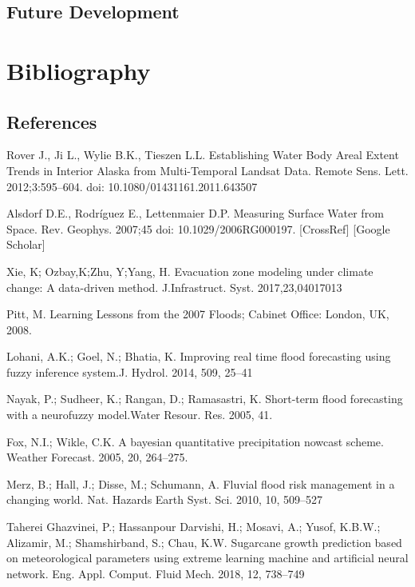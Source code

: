 \documentclass[12pt, a4paper]{report}
\begin{document}
\section{Future Development}

\newpage{}

\chapter{Bibliography} 

\section{References}

\begin{thebibliography}{widest entry}
 Rover J., Ji L., Wylie B.K., Tieszen L.L. Establishing Water Body Areal Extent Trends in Interior Alaska from Multi-Temporal Landsat Data. Remote Sens. Lett. 2012;3:595–604. doi: 10.1080/01431161.2011.643507

 Alsdorf D.E., Rodríguez E., Lettenmaier D.P. Measuring Surface Water from Space. Rev. Geophys. 2007;45 doi: 10.1029/2006RG000197. [CrossRef] [Google Scholar]

 Xie, K; Ozbay,K;Zhu, Y;Yang, H. Evacuation zone modeling under climate change: A data-driven method. J.Infrastruct. Syst. 2017,23,04017013

Pitt, M.	Learning Lessons from the 2007 Floods; Cabinet Office: London, UK, 2008.

Lohani, A.K.; Goel, N.; Bhatia, K. Improving real time flood forecasting using fuzzy inference system.J. Hydrol. 2014, 509, 25–41

Nayak, P.; Sudheer, K.; Rangan, D.; Ramasastri, K. Short-term flood forecasting with a neurofuzzy model.Water Resour. Res. 2005, 41.

Fox, N.I.; Wikle, C.K. A bayesian quantitative precipitation nowcast scheme. Weather Forecast. 2005, 20, 264–275.

Merz, B.; Hall, J.; Disse, M.; Schumann, A. Fluvial flood risk management in a changing world. Nat. Hazards Earth Syst. Sci. 2010, 10, 509–527

Taherei Ghazvinei, P.; Hassanpour Darvishi, H.; Mosavi, A.; Yusof, K.B.W.; Alizamir, M.; Shamshirband, S.; Chau, K.W. Sugarcane growth prediction based on meteorological parameters using extreme learning machine and artificial neural network. Eng. Appl. Comput. Fluid Mech. 2018, 12, 738–749


\end{thebibliography}
\end{document}
